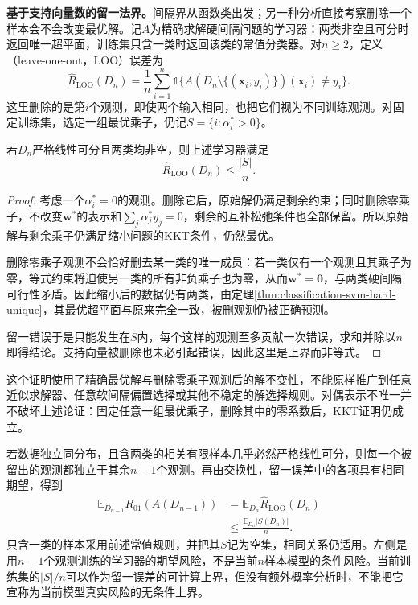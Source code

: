 \label{sec:classification-svm-loo}

\textbf{基于支持向量数的留一法界。}间隔界从函数类出发；另一种分析直接考察删除一个样本会不会改变最优解。记$A$为精确求解硬间隔问题的学习器：两类非空且可分时返回唯一超平面，训练集只含一类时返回该类的常值分类器。对$n\ge2$，定义（leave-one-out，LOO）误差为
\begin{equation}
  \widehat R_{\mathrm{LOO}}(D_n)
  =\frac1n\sum_{i=1}^n
    \mathbb{1}\bigl\{
       A(D_n\setminus\{(\bm{x}_i,y_i)\})(\bm{x}_i)
       \ne y_i
     \bigr\}.
  \label{eq:classification-svm-loo-definition}
\end{equation}
这里删除的是第$i$个观测，即使两个输入相同，也把它们视为不同训练观测。对固定训练集，选定一组最优乘子，仍记$S=\{i:\alpha_i^{\ast}>0\}$。

\begin{theorem}[硬间隔的支持向量计数界]
  \label{thm:classification-svm-loo-bound}
  若$D_n$严格线性可分且两类均非空，则上述学习器满足
  \[
    \widehat R_{\mathrm{LOO}}(D_n)\le\frac{|S|}{n}.
  \]
\end{theorem}
\begin{proof}
考虑一个$\alpha_i^{\ast}=0$的观测。删除它后，原始解仍满足剩余约束；同时删除零乘子，不改变$\bm{w}^{\ast}$的表示和$\sum_j\alpha_j^{\ast}y_j=0$，剩余的互补松弛条件也全部保留。所以原始解与剩余乘子仍满足缩小问题的KKT条件，仍然最优。

删除零乘子观测不会恰好删去某一类的唯一成员：若一类仅有一个观测且其乘子为零，等式约束将迫使另一类的所有非负乘子也为零，从而$\bm{w}^{\ast}=\bm{0}$，与两类硬间隔可行性矛盾。因此缩小后的数据仍有两类，由定理\ref{thm:classification-svm-hard-unique}，其最优超平面与原来完全一致，被删观测仍被正确预测。

留一错误于是只能发生在$S$内，每个这样的观测至多贡献一次错误，求和并除以$n$即得结论。支持向量被删除也未必引起错误，因此这里是上界而非等式。
\end{proof}

这个证明使用了精确最优解与删除零乘子观测后的解不变性，不能原样推广到任意近似求解器、任意软间隔偏置选择或其他不稳定的解选择规则。对偶表示不唯一并不破坏上述论证：固定任意一组最优乘子，删除其中的零系数后，KKT证明仍成立。

若数据独立同分布，且含两类的相关有限样本几乎必然严格线性可分，则每一个被留出的观测都独立于其余$n-1$个观测。再由交换性，留一误差中的各项具有相同期望，得到
\begin{equation}
  \begin{aligned}
    \mathbb{E}_{D_{n-1}}R_{01}(A(D_{n-1}))
      &=\mathbb{E}_{D_n}\widehat R_{\mathrm{LOO}}(D_n)\\
      &\le\frac{\mathbb{E}_{D_n}|S(D_n)|}{n}.
  \end{aligned}
  \label{eq:classification-svm-loo-expectation}
\end{equation}
只含一类的样本采用前述常值规则，并把其$S$记为空集，相同关系仍适用。左侧是用$n-1$个观测训练的学习器的期望风险，不是当前$n$样本模型的条件风险。当前训练集的$|S|/n$可以作为留一误差的可计算上界，但没有额外概率分析时，不能把它宣称为当前模型真实风险的无条件上界。

